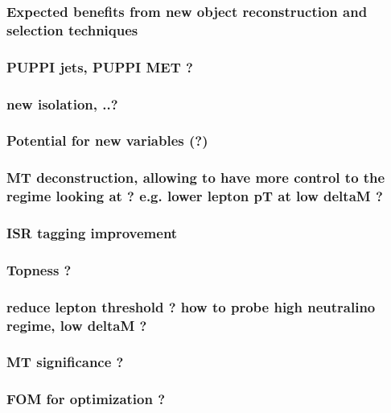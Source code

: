          \subsubsection{Expected benefits from new object reconstruction and selection techniques}

             \subsubsection{PUPPI jets, PUPPI MET ?}

             \subsubsection{new isolation, ..?}

         \subsubsection{Potential for new variables (?)}

             \subsubsection{MT deconstruction, allowing to have more control to the regime looking at ? e.g. lower lepton pT  at low deltaM ?}

             \subsubsection{ISR tagging improvement}

             \subsubsection{Topness ?}

             \subsubsection{reduce lepton threshold ? how to probe high neutralino regime, low deltaM ?}
             
             \subsubsection{MT significance ?}

             \subsubsection{FOM for optimization ?}
            
